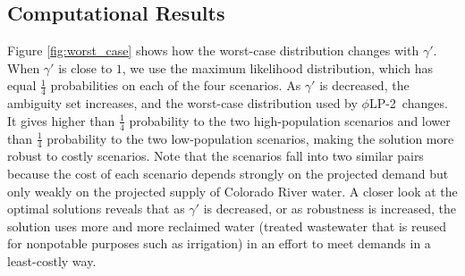 \documentclass[11pt]{article}
\newcommand{\plp}{$\phi$LP-2}
\begin{document}
\subsection{Computational Results}

Figure \ref{fig:worst_case} shows how the worst-case distribution changes with $\gamma'$.
When $\gamma'$ is close to $1$, we use the maximum likelihood distribution, which has equal $\tfrac{1}{4}$ probabilities on each of the four scenarios.
As $\gamma'$ is decreased, the ambiguity set increases, and the worst-case distribution used by \plp\ changes.
It gives higher than $\tfrac{1}{4}$ probability to the two high-population scenarios and lower than $\tfrac{1}{4}$ probability to the two low-population scenarios, making the solution more robust to costly scenarios.
Note that the scenarios fall into two similar pairs because the cost of each scenario depends strongly on the projected demand but only weakly on the projected supply of Colorado River water.
A closer look at the optimal solutions reveals that as $\gamma'$ is decreased, or as robustness is increased, the solution uses more and more reclaimed water (treated wastewater that is reused for nonpotable purposes such as irrigation) in an effort to meet demands in a least-costly way.
\end{document}
